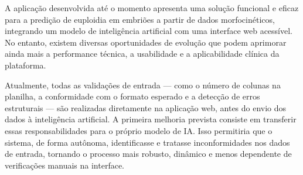 
A aplicação desenvolvida até o momento apresenta uma solução funcional e eficaz para a predição de euploidia em embriões a partir de dados morfocinéticos, integrando um modelo de inteligência artificial com uma interface web acessível. No entanto, existem diversas oportunidades de evolução que podem aprimorar ainda mais a performance técnica, a usabilidade e a aplicabilidade clínica da plataforma.

Atualmente, todas as validações de entrada — como o número de colunas na planilha, a conformidade com o formato esperado e a detecção de erros estruturais — são realizadas diretamente na aplicação web, antes do envio dos dados à inteligência artificial. A primeira melhoria prevista consiste em transferir essas responsabilidades para o próprio modelo de IA. Isso permitiria que o sistema, de forma autônoma, identificasse e tratasse inconformidades nos dados de entrada, tornando o processo mais robusto, dinâmico e menos dependente de verificações manuais na interface.

